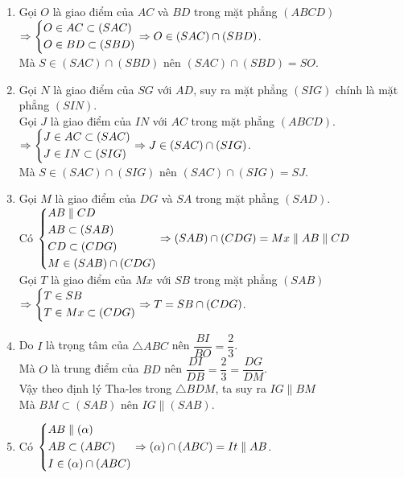 \begin{bt}
{\begin{center}
		\end{center}
		\begin{enumerate}
			\item Gọi $O$ là giao điểm của $AC$ và $BD$ trong mặt phẳng $(ABCD)$\\
			$\Rightarrow\left\{\begin{aligned}&O\in AC\subset (SAC)\\&O\in BD\subset(SBD)\end{aligned}\right.\Rightarrow O\in(SAC)\cap(SBD)$.\\
			Mà $S\in(SAC)\cap(SBD)$ nên $(SAC)\cap(SBD)=SO$.
			\item Gọi $N$ là giao điểm của $SG$ với $AD$, suy ra mặt phẳng $(SIG)$ chính là mặt phẳng $(SIN)$.\\
			Gọi $J$ là giao điểm của $IN$ với $AC$ trong mặt phẳng $(ABCD)$.\\
			$\Rightarrow\left\{\begin{aligned}&J\in AC\subset (SAC)\\&J\in IN\subset(SIG)\end{aligned}\right.\Rightarrow J\in(SAC)\cap(SIG)$.\\
			Mà $S\in(SAC)\cap(SIG)$ nên $(SAC)\cap(SIG)=SJ$.
			\item Gọi $M$ là giao điểm của $DG$ và $SA$ trong mặt phẳng $(SAD)$.\\
			Có $\left\{\begin{aligned}&AB\parallel CD\\&AB\subset(SAB)\\&CD\subset(CDG)\\&M\in(SAB)\cap(CDG)\end{aligned}\right.\Rightarrow (SAB)\cap(CDG)=Mx\parallel AB\parallel CD$\\
			Gọi $T$ là giao điểm của $Mx$ với $SB$ trong mặt phẳng $(SAB)$\\
			$\Rightarrow\left\{\begin{aligned}&T\in SB\\&T\in Mx\subset(CDG)\end{aligned}\right.\Rightarrow T=SB\cap(CDG)$.
			\item Do $I$ là trọng tâm của $\triangle ABC$ nên $\dfrac{BI}{BO}=\dfrac{2}{3}$.\\
			Mà $O$ là trung điểm của $BD$ nên $\dfrac{DI}{DB}=\dfrac{2}{3}=\dfrac{DG}{DM}$.\\
			Vậy theo định lý Tha-les trong $\triangle BDM$, ta suy ra $IG\parallel BM$\\
			Mà $BM\subset(SAB)$ nên $IG\parallel(SAB)$.
			\item Có $\left\{\begin{aligned}&AB\parallel(\alpha)\\&AB\subset(ABC)\\&I\in(\alpha)\cap(ABC)\end{aligned}\right.\Rightarrow (\alpha)\cap(ABC)=It\parallel AB$.\\

\end{enumerate}}
\end{bt}
